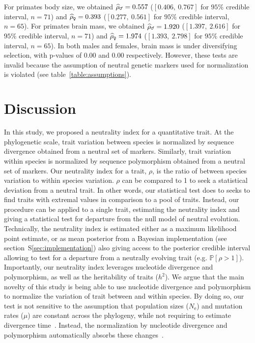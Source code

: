 \documentclass{article}
\newcommand{\Ne}{N_{\text{e}}}
\newcommand{\proba}{\mathbb{P}}
\newcommand{\NbrTaxa}{n}
\newcommand{\Heritability}{h^2}
\newcommand{\MutationRate}{\mu}
\newcommand{\NI}{\rho}
\newcommand{\EstNI}{\widehat{\rho}}
\begin{document}
For primates body size, we obtained $\EstNI_{\text{\Male}} = 0.557$ ($[0.406,~0.767]$ for $95\%$ credible interval, $\NbrTaxa=71$) and $\EstNI_{\text{\Female}} = 0.393$ ($[0.277,~0.561]$ for $95\%$ credible interval, $\NbrTaxa=65$).
For primates brain mass, we obtained $\EstNI_{\text{\Male}} = 1.920$ ($[1.397,~2.616]$ for $95\%$ credible interval, $\NbrTaxa=71$) and $\EstNI_{\text{\Female}} = 1.974$ ($[1.393,~2.798]$ for $95\%$ credible interval, $\NbrTaxa=65$).
In both males and females, brain mass is under diversifying selection, with p-values of $0.00$ and $0.00$ respectively.
However, these tests are invalid because the assumption of neutral genetic markers used for normalization is violated (see table~\ref{table:assumptions}).

\section*{Discussion}\label{sec:discussion}

In this study, we proposed a neutrality index for a quantitative trait.
At the phylogenetic scale, trait variation between species is normalized by sequence divergence obtained from a neutral set of markers.
Similarly, trait variation within species is normalized by sequence polymorphism obtained from a neutral set of markers.
Our neutrality index for a trait, $\NI$, is the ratio of between species variation to within species variation.
$\NI$ can be compared to 1 to seek a statistical deviation from a neutral trait.
In other words, our statistical test does to seeks to find traits with extremal values in comparison to a pool of traits.
Instead, our procedure can be applied to a single trait, estimating the neutrality index and giving a statistical test for departure from the null model of neutral evolution.
Technically, the neutrality index is estimated either as a maximum likelihood point estimate, or as mean posterior from a Bayesian implementation (see section~S\ref{sec:implementation}) also giving access to the posterior credible interval allowing to test for a departure from a neutrally evolving trait (e.g. $ \proba [ \NI > 1 ]$).
Importantly, our neutrality index leverages nucleotide divergence and polymorphism, as well as the heritability of traits ($\Heritability$).
We argue that the main novelty of this study is being able to use nucleotide divergence and polymorphism to normalize the variation of trait between and within species.
By doing so, our test is not sensitive to the assumption that population sizes ($\Ne$) and mutation rates ($\MutationRate$) are constant across the phylogeny, while not requiring to estimate divergence time~\cite{litsios_effects_2012}.
Instead, the normalization by nucleotide divergence and polymorphism automatically absorbs these changes~\cite{seo_estimating_2004}.
\end{document}
